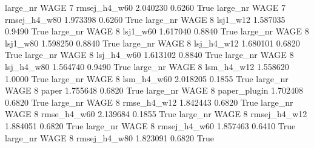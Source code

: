   large_nr     WAGE                 7 rmsej_h4_w60    2.040230      0.6260    True
  large_nr     WAGE                 7 rmsej_h4_w80    1.973398      0.6260    True
  large_nr     WAGE                 8     lsj1_w12    1.587035      0.9490    True
  large_nr     WAGE                 8     lsj1_w60    1.617040      0.8840    True
  large_nr     WAGE                 8     lsj1_w80    1.598250      0.8840    True
  large_nr     WAGE                 8   lsj_h4_w12    1.680101      0.6820    True
  large_nr     WAGE                 8   lsj_h4_w60    1.613102      0.8840    True
  large_nr     WAGE                 8   lsj_h4_w80    1.564740      0.9490    True
  large_nr     WAGE                 8   lsm_h4_w12    1.558620      1.0000    True
  large_nr     WAGE                 8   lsm_h4_w60    2.018205      0.1855    True
  large_nr     WAGE                 8        paper    1.755648      0.6820    True
  large_nr     WAGE                 8 paper_plugin    1.702408      0.6820    True
  large_nr     WAGE                 8  rmse_h4_w12    1.842443      0.6820    True
  large_nr     WAGE                 8  rmse_h4_w60    2.139684      0.1855    True
  large_nr     WAGE                 8 rmsej_h4_w12    1.884051      0.6820    True
  large_nr     WAGE                 8 rmsej_h4_w60    1.857463      0.6410    True
  large_nr     WAGE                 8 rmsej_h4_w80    1.823091      0.6820    True